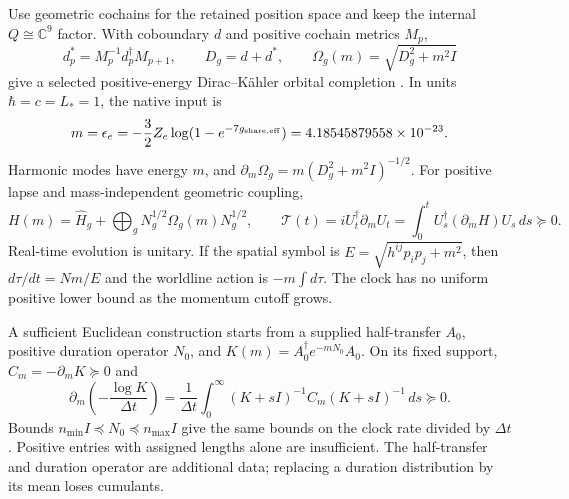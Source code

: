 \documentclass[11pt]{article}
\begin{document}
Use geometric cochains for the retained position space and keep
the internal \(Q\cong\mathbb C^9\) factor.
With coboundary \(d\) and positive cochain metrics \(M_p\),
\[
d_p^*=M_p^{-1}d_p^\dagger M_{p+1},\qquad
D_g=d+d^*,\qquad
\Omega_g(m)=\sqrt{D_g^2+m^2I}
\]
give a selected positive-energy Dirac--K\"ahler orbital
completion \citep{AQGBecher1982}.
In units \(\hbar=c=L_*=1\), the native input is
\[
m=\epsilon_e=-\frac32Z_e\log(1-e^{-7g_{\rm share,eff}})
=4.18545879558\times10^{-23}.
\]
Harmonic modes have energy \(m\), and
\(\partial_m\Omega_g=m(D_g^2+m^2I)^{-1/2}\).
For positive lapse and mass-independent geometric coupling,
\[
H(m)=\widehat H_g+\bigoplus_gN_g^{1/2}\Omega_g(m)N_g^{1/2},
\qquad
\mathcal T(t)=iU_t^\dagger\partial_mU_t
=\int_0^tU_s^\dagger(\partial_mH)U_s\,ds\succeq0.
\]
Real-time evolution is unitary. If the spatial symbol is
\(E=\sqrt{h^{ij}p_ip_j+m^2}\), then \(d\tau/dt=Nm/E\) and the
worldline action is \(-m\int d\tau\). The clock has no uniform
positive lower bound as the momentum cutoff grows.

A sufficient Euclidean construction starts from a supplied
half-transfer \(A_0\), positive duration operator \(N_0\), and
\(K(m)=A_0^\dagger e^{-mN_0}A_0\).
On its fixed support, \(C_m=-\partial_mK\succeq0\) and
\[
\partial_m\!\left(-\frac{\log K}{\Delta t}\right)
=\frac1{\Delta t}\int_0^\infty
(K+sI)^{-1}C_m(K+sI)^{-1}\,ds\succeq0.
\]
Bounds \(n_{\min}I\preceq N_0\preceq n_{\max}I\) give the
same bounds on the clock rate divided by \(\Delta t\).
Positive entries with assigned lengths alone are insufficient.
The half-transfer and duration operator are additional data;
replacing a duration distribution by its mean loses cumulants.
\end{document}
